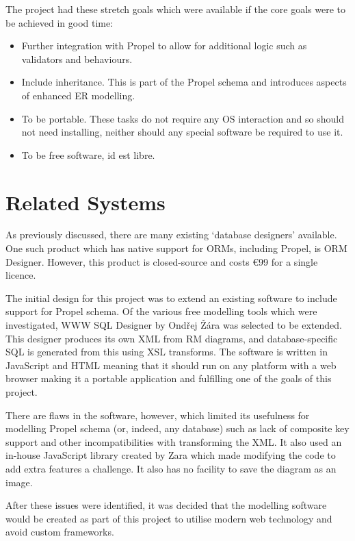 The project had these stretch goals which were available if the core goals were to be achieved in good time:
\begin{itemize}
	\item Further integration with Propel to allow for additional logic such as validators and behaviours.
	\item Include inheritance. This is part of the Propel schema and introduces aspects of enhanced ER modelling.
	\item To be portable. These tasks do not require any OS interaction and so should not need installing, neither should any special software be required to use it.
	\item To be free software, id est libre.
\end{itemize}

\section{Related Systems}
As previously discussed, there are many existing `database designers' available. One such product which has native support for ORMs, including Propel, is ORM Designer. However, this product is closed-source and costs \euro99 for a single licence.

The initial design for this project was to extend an existing software to include support for Propel schema. Of the various free modelling tools which were investigated, WWW SQL Designer by Ond\v{r}ej \v{Z}\'{a}ra was selected to be extended. This designer produces its own XML from RM diagrams, and database-specific SQL is generated from this using XSL transforms. The software is written in JavaScript and HTML meaning that it should run on any platform with a web browser making it a portable application and fulfilling one of the goals of this project.

There are flaws in the software, however, which limited its usefulness for modelling Propel schema (or, indeed, any database) such as lack of composite key support and other incompatibilities with transforming the XML. It also used an in-house JavaScript library created by Zara which made modifying the code to add extra features a challenge. It also has no facility to save the diagram as an image.

After these issues were identified, it was decided that the modelling software would be created as part of this project to utilise modern web technology and avoid custom frameworks.